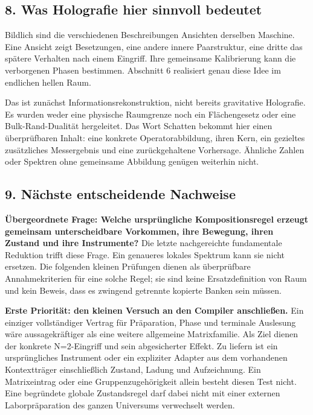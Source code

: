 \subsection{8. Was Holografie hier sinnvoll
bedeutet}\label{was-holografie-hier-sinnvoll-bedeutet}

Bildlich sind die verschiedenen Beschreibungen Ansichten derselben
Maschine. Eine Ansicht zeigt Besetzungen, eine andere innere
Paarstruktur, eine dritte das spätere Verhalten nach einem Eingriff.
Ihre gemeinsame Kalibrierung kann die verborgenen Phasen bestimmen.
Abschnitt 6 realisiert genau diese Idee im endlichen hellen Raum.

Das ist zunächst Informationsrekonstruktion, nicht bereits gravitative
Holografie. Es wurden weder eine physische Raumgrenze noch ein
Flächengesetz oder eine Bulk-Rand-Dualität hergeleitet. Das Wort
Schatten bekommt hier einen überprüfbaren Inhalt: eine konkrete
Operatorabbildung, ihren Kern, ein gezieltes zusätzliches Messergebnis
und eine zurückgehaltene Vorhersage. Ähnliche Zahlen oder Spektren ohne
gemeinsame Abbildung genügen weiterhin nicht.

\subsection{9. Nächste entscheidende
Nachweise}\label{nuxe4chste-entscheidende-nachweise}

\textbf{Übergeordnete Frage: Welche ursprüngliche Kompositionsregel
erzeugt gemeinsam unterscheidbare Vorkommen, ihre Bewegung, ihren
Zustand und ihre Instrumente?} Die letzte nachgereichte fundamentale
Reduktion trifft diese Frage. Ein genaueres lokales Spektrum kann sie
nicht ersetzen. Die folgenden kleinen Prüfungen dienen als überprüfbare
Annahmekriterien für eine solche Regel; sie sind keine Ersatzdefinition
von Raum und kein Beweis, dass es zwingend getrennte kopierte Banken
sein müssen.

\textbf{Erste Priorität: den kleinen Versuch an den Compiler
anschließen.} Ein einziger vollständiger Vertrag für Präparation, Phase
und terminale Auslesung wäre aussagekräftiger als eine weitere
allgemeine Matrixfamilie. Als Ziel dienen der konkrete N=2-Eingriff und
sein abgesicherter Effekt. Zu liefern ist ein ursprüngliches Instrument
oder ein expliziter Adapter aus dem vorhandenen Kontextträger
einschließlich Zustand, Ladung und Aufzeichnung. Ein Matrixeintrag oder
eine Gruppenzugehörigkeit allein besteht diesen Test nicht. Eine
begründete globale Zustandsregel darf dabei nicht mit einer externen
Laborpräparation des ganzen Universums verwechselt werden.

